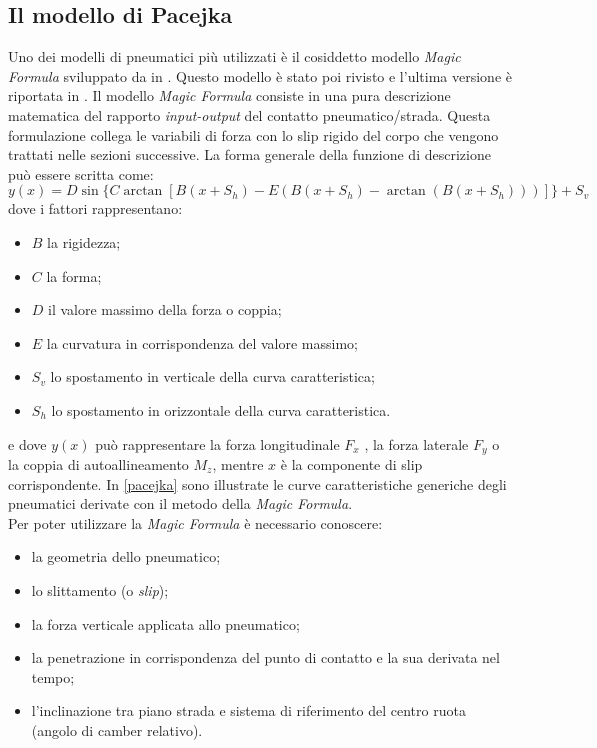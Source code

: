 \subsection{Il modello di Pacejka}
Uno dei modelli di pneumatici più utilizzati è il cosiddetto modello \textit{Magic Formula} sviluppato da \citeauthor{bakker} in \cite{bakker}. Questo modello è stato poi rivisto e l'ultima versione è riportata in \cite{hans}. Il modello \textit{Magic Formula} consiste in una pura descrizione matematica del rapporto \textit{input-output} del contatto pneumatico/strada. Questa formulazione collega le variabili di forza con lo slip rigido del corpo che vengono trattati nelle sezioni successive. La forma generale della funzione di descrizione può essere scritta come:
%
\begin{equation}
y(x) = D\sin\{C\arctan[B(x + S_h ) - E(B(x + S_h ) - \arctan(B(x + S_h )))]\} + S_v
\end{equation}
%
dove i fattori rappresentano:
\begin{itemize}
	\item $B$ la rigidezza;
	\item $C$ la forma;
	\item $D$ il valore massimo della forza o coppia;
	\item $E$ la curvatura in corrispondenza del valore massimo;
	\item $S_v$ lo spostamento in verticale della curva caratteristica;
	\item $S_h$ lo spostamento in orizzontale della curva caratteristica.
\end{itemize}
e dove $y(x)$ può rappresentare la forza longitudinale $F_x$ , la forza laterale $F_y$ o la coppia di autoallineamento $M_z$, mentre $x$ è la componente di slip corrispondente. In \figurename{ \ref{pacejka}} sono illustrate le curve caratteristiche generiche degli pneumatici derivate con il metodo della \textit{Magic Formula}.\\
Per poter utilizzare la \textit{Magic Formula} è necessario conoscere:
\begin{itemize}
	\item la geometria dello pneumatico;
	\item lo slittamento (o \textit{slip});
	\item la forza verticale applicata allo pneumatico;
	\item la penetrazione in corrispondenza del punto di contatto e la sua derivata nel tempo;
	\item l'inclinazione tra piano strada e sistema di riferimento del centro ruota (angolo di camber relativo).
\end{itemize}
